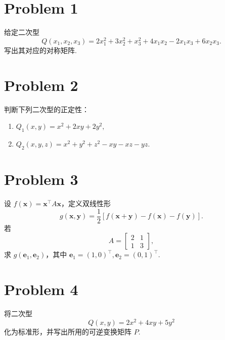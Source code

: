 \section*{Problem 1}

给定二次型
\[
Q \left(x_1, x_2, x_3\right) = 2x_1^2 + 3x_2^2 + x_3^2 + 4x_1x_2 - 2x_1x_3 + 6x_2x_3.
\]
写出其对应的对称矩阵.

\section*{Problem 2}

判断下列二次型的正定性：

\begin{enumerate}[]
    \item $Q_1 \left(x, y\right) = x^2 + 2xy + 2y^2, $
    \item $Q_2 \left(x, y, z\right) = x^2 + y^2 + z^2 - xy - xz - yz.$
\end{enumerate}

\section*{Problem 3}

设 $f(\boldsymbol{x}) = \boldsymbol{x}^\top A \boldsymbol{x}$，定义双线性形
\[
g\left(\boldsymbol{x}, \boldsymbol{y}\right) = \frac{1}{2} \left[f \left(\boldsymbol{x} + \boldsymbol{y}\right) - f\left(\boldsymbol{x}\right) - f\left(\boldsymbol{y}\right)\right].
\]
若
\[
A =
\begin{bmatrix}
2 & 1 \\
1 & 3
\end{bmatrix},
\]
求 $g \left(\boldsymbol{e}_1, \boldsymbol{e}_2\right)$，其中 $\boldsymbol{e}_1 = \left(1, 0\right)^\top, \boldsymbol{e}_2 = \left(0, 1\right)^\top$.

\section*{Problem 4}

将二次型
\[
Q \left(x, y\right) = 2x^2 + 4xy + 5y^2
\]
化为标准形，并写出所用的可逆变换矩阵 $P$.
